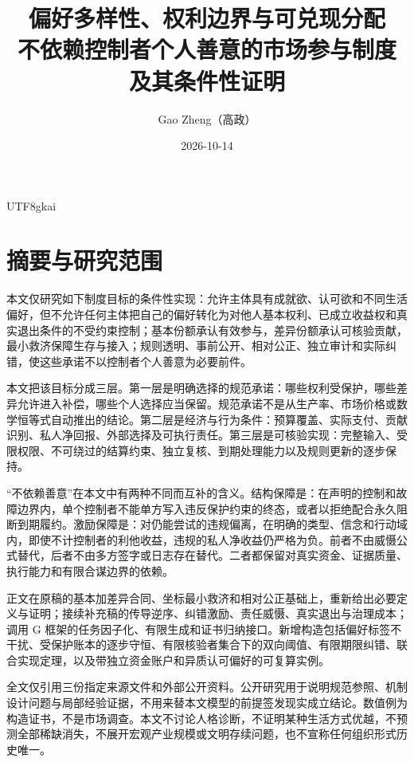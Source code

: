 \documentclass[12pt,a4paper,openany]{report}
\begin{document}
\begin{CJK*}{UTF8}{gkai}
\raggedbottom
{}
\title{偏好多样性、权利边界与可兑现分配\\[0.6em]
\large 不依赖控制者个人善意的市场参与制度\\及其条件性证明}
\author{Gao Zheng（高政）}
\date{2026-10-14}
\maketitle
\setcounter{page}{2}
\chapter*{摘要与研究范围}
本文仅研究如下制度目标的条件性实现：允许主体具有成就欲、认可欲和不同生活偏好，但不允许任何主体把自己的偏好转化为对他人基本权利、已成立收益权和真实退出条件的不受约束控制；基本份额承认有效参与，差异份额承认可核验贡献，最小救济保障生存与接入；规则透明、事前公开、相对公正、独立审计和实际纠错，使这些承诺不以控制者个人善意为必要前件。

本文把该目标分成三层。第一层是明确选择的规范承诺：哪些权利受保护，哪些差异允许进入补偿，哪些个人选择应当保留。规范承诺不是从生产率、市场价格或数学恒等式自动推出的结论。第二层是经济与行为条件：预算覆盖、实际支付、贡献识别、私人净回报、外部选择及可执行责任。第三层是可核验实现：完整输入、受限权限、不可绕过的结算约束、独立复核、到期处理能力以及规则更新的逐步保持。

“不依赖善意”在本文中有两种不同而互补的含义。结构保障是：在声明的控制和故障边界内，单个控制者不能单方写入违反保护约束的终态，或者以拒绝配合永久阻断到期履约。激励保障是：对仍能尝试的违规偏离，在明确的类型、信念和行动域内，即使不计控制者的利他收益，违规的私人净收益仍严格为负。前者不由威慑公式替代，后者不由多方签字或日志存在替代。二者都保留对真实资金、证据质量、执行能力和有限合谋边界的依赖。

正文在原稿的基本加差异合同、坐标最小救济和相对公正基础上，重新给出必要定义与证明；接续补充稿的传导逆序、纠错激励、责任威慑、真实退出与治理成本；调用 G 框架的任务因子化、有限生成和证书归纳接口。新增构造包括偏好标签不干扰、受保护账本的逐步守恒、有限核验者集合下的双向阈值、有限期限纠错、联合实现定理，以及带独立资金账户和异质认可偏好的可复算实例。

全文仅引用三份指定来源文件和外部公开资料。公开研究用于说明规范参照、机制设计问题与局部经验证据，不用来替本文模型的前提签发现实成立结论。数值例为构造证书，不是市场调查。本文不讨论人格诊断，不证明某种生活方式优越，不预测全部稀缺消失，不展开宏观产业规模或文明存续问题，也不宣称任何组织形式历史唯一。


\end{CJK*}
\end{document}
